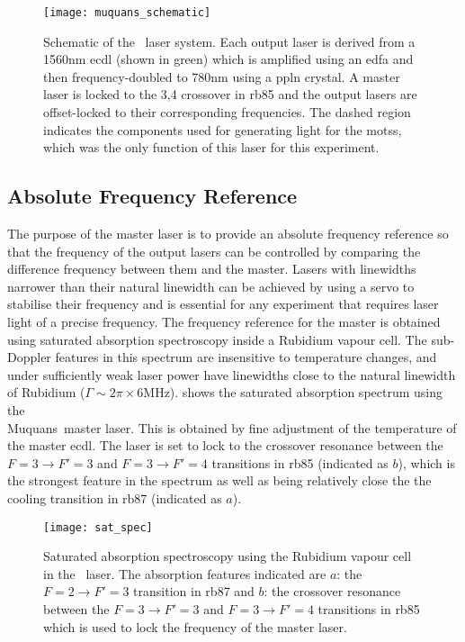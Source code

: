\begin{figure}
    \texttt{[image: muquans\_schematic]}
    \caption[\Muquans\ Laser System Diagram]{Schematic of the \Muquans\ laser system. Each output laser is derived from a 1560nm \acs{ecdl} (shown in green) which is amplified using an \acs{edfa} and then frequency-doubled to 780nm using a \acs{ppln} crystal. A master laser is locked to the 3,4 crossover in \ac{rb85} and the output lasers are offset-locked to their corresponding frequencies. The dashed region indicates the components used for generating light for the \acp{mots}, which was the only function of this laser for this experiment.}\label{fig:muquans_schematic}
\end{figure}
\subsection{Absolute Frequency Reference}\label{subsec:muquans_master}
The purpose of the master laser is to provide an absolute frequency reference so that the frequency of the output lasers can be controlled by comparing the difference frequency between them and the master. Lasers with linewidths narrower than their natural linewidth can be achieved by using a servo to stabilise their frequency and is essential for any experiment that requires laser light of a precise frequency. The frequency reference for the master is obtained using saturated absorption spectroscopy inside a Rubidium vapour cell. The sub-Doppler features in this spectrum are insensitive to temperature changes, and under sufficiently weak laser power have linewidths close to the natural linewidth of Rubidium (\(\Gamma \sim 2\pi \times 6\)MHz).  shows the saturated absorption spectrum using the \\Muquans\ master laser. This is obtained by fine adjustment of the temperature of the master \ac{ecdl}. The laser is set to lock to the crossover resonance between the \(F = 3 \rightarrow F' = 3\) and \(F = 3 \rightarrow F' =4 \) transitions in \ac{rb85} (indicated as \(b\)), which is the strongest feature in the spectrum as well as being relatively close the the cooling transition in \ac{rb87} (indicated as \(a\)).   
\begin{figure}
    \texttt{[image: sat\_spec]}
    \caption[Saturated absorption spectroscopy of the \\Muquans\ master laser.]{Saturated absorption spectroscopy using the Rubidium vapour cell in the \Muquans\ laser. The absorption features indicated are \(a\): the \(F = 2 \rightarrow F' = 3\) transition in \ac{rb87} and \(b\): the crossover resonance between the \(F = 3 \rightarrow F' = 3\) and \(F = 3 \rightarrow F' =4 \) transitions in \ac{rb85} which is used to lock the frequency of the master laser.}\label{fig:muquans_satspec}
\end{figure}
